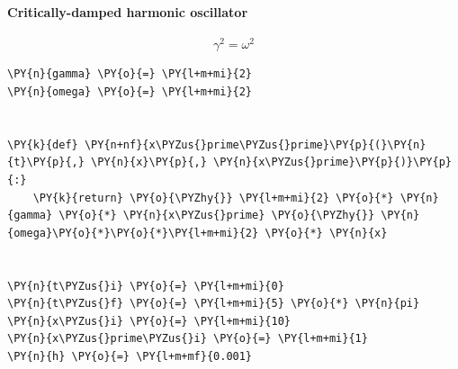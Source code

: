     \begin{center}
    \end{center}
    { \hspace*{\fill} \\}
    
    \hypertarget{critically-damped-harmonic-oscillator}{%
\paragraph{Critically-damped harmonic
oscillator}\label{critically-damped-harmonic-oscillator}}

\[\gamma^2 = \omega^2\]

    \begin{tcolorbox}[breakable, size=fbox, boxrule=1pt, pad at break*=1mm,colback=cellbackground, colframe=cellborder]
\begin{Verbatim}[commandchars=\\\{\}]
\PY{n}{gamma} \PY{o}{=} \PY{l+m+mi}{2}
\PY{n}{omega} \PY{o}{=} \PY{l+m+mi}{2}


\PY{k}{def} \PY{n+nf}{x\PYZus{}prime\PYZus{}prime}\PY{p}{(}\PY{n}{t}\PY{p}{,} \PY{n}{x}\PY{p}{,} \PY{n}{x\PYZus{}prime}\PY{p}{)}\PY{p}{:}
    \PY{k}{return} \PY{o}{\PYZhy{}} \PY{l+m+mi}{2} \PY{o}{*} \PY{n}{gamma} \PY{o}{*} \PY{n}{x\PYZus{}prime} \PY{o}{\PYZhy{}} \PY{n}{omega}\PY{o}{*}\PY{o}{*}\PY{l+m+mi}{2} \PY{o}{*} \PY{n}{x}


\PY{n}{t\PYZus{}i} \PY{o}{=} \PY{l+m+mi}{0}
\PY{n}{t\PYZus{}f} \PY{o}{=} \PY{l+m+mi}{5} \PY{o}{*} \PY{n}{pi}
\PY{n}{x\PYZus{}i} \PY{o}{=} \PY{l+m+mi}{10}
\PY{n}{x\PYZus{}prime\PYZus{}i} \PY{o}{=} \PY{l+m+mi}{1}
\PY{n}{h} \PY{o}{=} \PY{l+m+mf}{0.001}
\end{Verbatim}
\end{tcolorbox}

